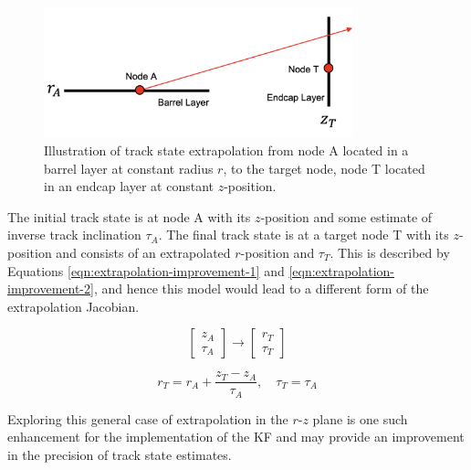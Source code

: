 \begin{figure}[htbp]
    \centering
    \includegraphics[width=0.8\textwidth]{images/7-results/improvement-extrapolation.png}
    \caption{Illustration of track state extrapolation from node A located in a barrel layer at constant radius $r$, to the target node, node T located in an endcap layer at constant $z$-position.}
    \label{fig:improvement-extrapolation}%
\end{figure}


The initial track state is at node A with its $z$-position and some estimate of inverse track inclination $\tau_A$. The final track state is at a target node T with its $z$-position and consists of an extrapolated $r$-position and $\tau_T$. This is described by Equations \eqref{eqn:extrapolation-improvement-1}  and \eqref{eqn:extrapolation-improvement-2}, and hence this model would lead to a different form of the extrapolation Jacobian.

\begin{equation}
    \begin{bmatrix} z_A \\ \tau_A \end{bmatrix} 
    \rightarrow
    \begin{bmatrix} r_T \\ \tau_T \end{bmatrix} 
    \label{eqn:extrapolation-improvement-1}
\end{equation}

\begin{equation}
    r_T = r_A + \frac{z_T - z_A}{\tau_A}, \quad \tau_T = \tau_A
    \label{eqn:extrapolation-improvement-2}
\end{equation}


Exploring this general case of extrapolation in the $r$-$z$ plane is one such enhancement for the implementation of the KF and may provide an improvement in the precision of track state estimates.







